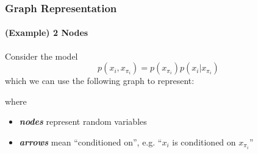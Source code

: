 \documentclass[11pt]{article}
\begin{document}
\subsubsection{Graph Representation} 
\paragraph{(Example) 2 Nodes}Consider the model
\begin{equation*}
    p\left(x_{i}, x_{\pi_{i}}\right)=p\left(x_{\pi_{i}}\right) p\left(x_{i} | x_{\pi_{i}}\right)
\end{equation*}
which we can use the following graph to represent:
\begin{center}
\end{center}
where
\begin{itemize}
    \item \textit{\textbf{nodes}} represent random variables
    \item \textit{\textbf{arrows}} mean ``conditioned on'', e.g. ``$x_i$ is conditioned on $x_{\pi_i}$''
\end{itemize}
\end{document}

